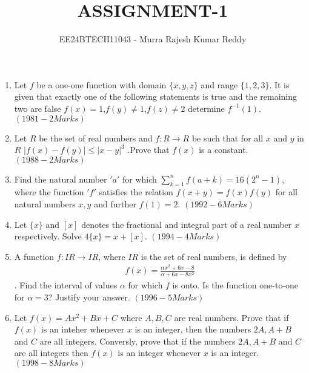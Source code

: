 \documentclass[journal,12pt,twocolumn,article]{IEEEtran}
\theoremstyle{remark}
\begin{document}

\vspace{4cm}
\title{ASSIGNMENT-1}
\author{EE24BTECH11043 - Murra Rajesh Kumar Reddy}
\maketitle
\bigskip
\begin{enumerate}[start=6]
	\item Let $f$ be a one-one function with domain $\{x,y,z\}$ and range $\{1,2,3\}$. It is given that exactly one of the following statements is true and the remaining two are false ${f(x)=1}$,${f(y)\neq1}$,$f(z)\neq2$ determine $f^{-1}(1)$. \hfill${(1981 - 2 Marks)}$
	\item Let $R$ be the set of real numbers and $f:R \to R$ be such that for all $x$ and $y$ in $R$ ${|f(x)-f(y)| \le |x-y|^3}$ .Prove that $f(x)$ is a constant. \hfill${(1988 - 2 Marks)}$
	\item Find the natural number $'a'$ for which ${\sum\limits_{k=1}^nf(a+k)=16(2^n -1)}$, where the function $'f'$ satisfies the relation ${f(x+y)=f(x)f(y)}$ for all natural numbers $x,y$ and further ${f(1)=2}$. \hfill${(1992- 6 Marks)}$
	\item Let $\{x\}$ and $[x]$ denotes the fractional and integral part of a real number $x$ respectively. Solve $4\{x\}=x+[x]$. \hfill${(1994- 4 Marks)}$
	\item A function $f:IR\to IR$, where $IR$ is the set of real numbers, is defined by
		\begin{align*}
			{f(x)=\frac{\alpha x^2 +6x -8}{\alpha +6x-8x^2}}
		\end{align*}
		. Find the interval of values $\alpha$ for which $f$ is onto. Is the function one-to-one for $\alpha=3$? Justify your answer. \hfill${(1996- 5 Marks)}$
	\item Let ${f(x)=Ax^2+Bx+C}$ where $A,B,C$ are real numbers. Prove that if $f(x)$ is an inteher whenever $x$ is an integer, then the numbers $2A,A+B$ and $C$ are all integers. Conversly, prove that if the numbers $2A,A+B$ and $C$ are all integers then $f(x)$ is an integer whenever $x$ is an integer. \hfill${(1998- 8 Marks)}$ 
\end{enumerate}
	\onecolumn
\end{document}
